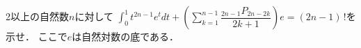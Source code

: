 \documentclass[../../main.tex]{subfiles}
\begin{document}
2以上の自然数$n$に対して
$\displaystyle \int_0^1 t^{2n-1} e^t dt + \left( \sum_{k=1}^{n-1} \dfrac{_{2n-1}P_{2n-2k}}{2k+1} \right) e=(2n-1) \, !$を示せ．
ここで$e$は自然対数の底である．
\end{document}
